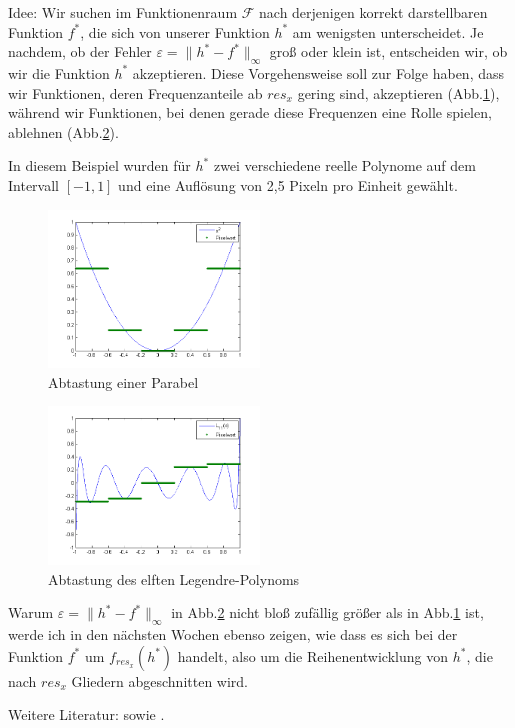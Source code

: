 \documentclass[a4paper]{article}
\begin{document}
Idee: Wir suchen im Funktionenraum $\mathcal{F}$ nach derjenigen korrekt darstellbaren Funktion $f^*$, die sich von unserer Funktion $h^*$ am wenigsten unterscheidet. Je nachdem, ob der Fehler $\varepsilon=\lVert h^*-f^*\rVert_{\infty}$ groß oder klein ist, entscheiden wir, ob wir die Funktion $h^*$ akzeptieren.
Diese Vorgehensweise soll zur Folge haben, dass wir Funktionen, deren Frequenzanteile ab $res_x$ gering sind, akzeptieren (Abb.\ref{Abb.1}), während wir Funktionen, bei denen gerade diese Frequenzen eine Rolle spielen, ablehnen (Abb.\ref{Abb.2}).

In diesem Beispiel wurden für $h^*$ zwei verschiedene reelle Polynome auf dem Intervall $[-1,1]$ und eine Auflösung von 2,5 Pixeln pro Einheit gewählt.

\begin{figure}[ht]
\centering
\includegraphics[width=0.5\textwidth]{parabelplot.png}
\caption{Abtastung einer Parabel}
\label{Abb.1}
\end{figure}
\begin{figure}[ht]
\centering
\includegraphics[width=0.5\textwidth]{legendre11plot.png}
\caption{Abtastung des elften Legendre-Polynoms}
\label{Abb.2}
\end{figure}

Warum $\varepsilon=\lVert h^*-f^*\rVert_{\infty}$ in Abb.\ref{Abb.2} nicht bloß zufällig größer als in Abb.\ref{Abb.1} ist, werde ich in den nächsten Wochen ebenso zeigen, wie dass es sich bei der Funktion $f^*$ um $f_{res_x}(h^*)$ handelt, also um die Reihenentwicklung von $h^*$, die nach $res_x$ Gliedern abgeschnitten wird.

Weitere Literatur: \cite[]{Achilles1978} sowie \cite[]{Schroeder1978}.



\end{document}
